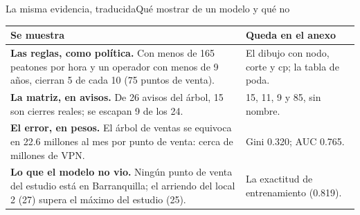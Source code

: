 \documentclass{beamer}
\begin{document}
\begin{frame}{La misma evidencia, traducida}{Qué mostrar de un modelo y qué no}
\footnotesize
\begin{tabular}{@{}L{0.57\textwidth}L{0.34\textwidth}@{}}
\toprule
Se muestra & Queda en el anexo \\
\midrule
\textbf{Las reglas, como política.} Con menos de 165 peatones por hora y un operador con menos de 9 años, cierran 5 de cada 10 (75 puntos de venta). & El dibujo con nodo, corte y cp; la tabla de poda. \\
\textbf{La matriz, en avisos.} De 26 avisos del árbol, 15 son cierres reales; se escapan 9 de los 24. & 15, 11, 9 y 85, sin nombre. \\
\textbf{El error, en pesos.} El árbol de ventas se equivoca en 22.6 millones al mes por punto de venta: cerca de  millones de VPN. & Gini 0.320; AUC 0.765. \\
\textbf{Lo que el modelo no vio.} Ningún punto de venta del estudio está en Barranquilla; el arriendo del local 2 (27) supera el máximo del estudio (25). & La exactitud de entrenamiento (0.819). \\
\bottomrule
\end{tabular}

\smallskip
{}
\end{frame}
\end{document}
